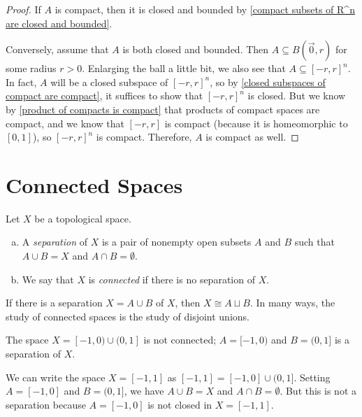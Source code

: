 \documentclass[noname]{notes}
\begin{document}
\begin{proof}
	If $A$ is compact, then it is closed and bounded by \cref{compact subsets of R^n are closed and bounded}. 
	
	\bigskip
	
	Conversely, assume that $A$ is both closed and bounded. Then $A \subseteq B(\vec{0},r)$ for some radius $r > 0$. Enlarging the ball a little bit, we also see that $A \subseteq [-r,r]^n$. In fact, $A$ will be a closed subspace of $[-r,r]^n$, so by \cref{closed subspaces of compact are compact}, it suffices to show that $[-r,r]^n$ is closed. But we know by \cref{product of compacts is compact} that products of compact spaces are compact, and we know that $[-r,r]$ is compact (because it is homeomorphic to $[0,1]$), so $[-r,r]^n$ is compact. Therefore, $A$ is compact as well. 
\end{proof}

\section{Connected Spaces}


\begin{definition}
	Let $X$ be a topological space. 
	\begin{enumerate}[(a)]
		\item A \emph{separation} of $X$ is a pair of nonempty open subsets $A$ and $B$ such that $A \cup B = X$ and $A \cap B = \emptyset$. 
		\item We say that $X$ is \emph{connected} if there is no separation of $X$. 
	\end{enumerate}
\end{definition}

If there is a separation $X = A \cup B$ of $X$, then $X \cong A \sqcup B$. In many ways, the study of connected spaces is the study of disjoint unions. 

\begin{example}
	The space $X = [-1,0) \cup (0,1]$ is not connected; $A = [-1,0)$ and $B = (0,1]$ is a separation of $X$. 
\end{example}

\begin{example}
	We can write the space $X = [-1,1]$ as $[-1,1] = [-1,0] \cup (0,1]$. Setting $A = [-1,0]$ and $B = (0,1]$, we have $A \cup B = X$ and $A \cap B = \emptyset$. But this is not a separation because $A = [-1,0]$ is not closed in $X = [-1,1]$. 
\end{example}
\end{document}
